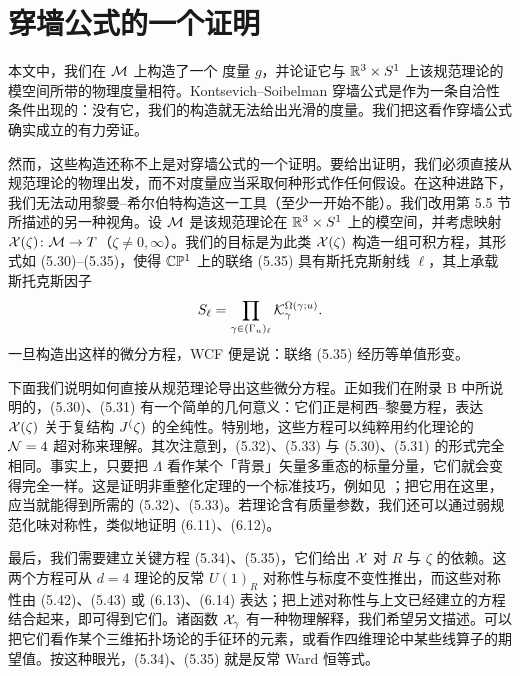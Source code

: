 \section{穿墙公式的一个证明}
\label{sec:proof}

本文中，我们在 $\mathcal{M}$ 上构造了一个 \hk 度量 $g$，并论证它与 $\mathbb{R}^3\times S^1$ 上该规范理论的模空间所带的物理度量相符。Kontsevich--Soibelman 穿墙公式是作为一条自洽性条件出现的：没有它，我们的构造就无法给出光滑的度量。我们把这看作穿墙公式确实成立的有力旁证。

然而，这些构造还称不上是对穿墙公式的一个证明。要给出证明，我们必须直接从规范理论的物理出发，而不对度量应当采取何种形式作任何假设。在这种进路下，我们无法动用黎曼--希尔伯特构造这一工具（至少一开始不能）。我们改用第 5.5 节所描述的另一种视角。设 $\mathcal{M}$ 是该规范理论在 $\mathbb{R}^3\times S^1$ 上的模空间，并考虑映射 $\mathcal{X}(\zeta)\colon \mathcal{M}\to T$（$\zeta\neq0,\infty$）。我们的目标是为此类 $\mathcal{X}(\zeta)$ 构造一组可积方程，其形式如 (5.30)–(5.35)，使得 $\mathbb{C}\mathbb{P}^1$ 上的联络 (5.35) 具有斯托克斯射线 $\ell$，其上承载斯托克斯因子
\begin{equation} \label{eq:sf-redux}
S_\ell = \prod_{\gamma \in (\Gamma_u)_\ell} \mathcal{K}_\gamma^{\Omega(\gamma;u)}.
\end{equation}
一旦构造出这样的微分方程，WCF 便是说：联络 (5.35) 经历等单值形变。%

下面我们说明如何直接从规范理论导出这些微分方程。正如我们在附录 B 中所说明的，(5.30)、(5.31) 有一个简单的几何意义：它们正是柯西--黎曼方程，表达 $\mathcal{X}(\zeta)$ 关于复结构 $J^(\zeta)$ 的全纯性。特别地，这些方程可以纯粹用约化理论的 $\mathcal{N}=4$ 超对称来理解。其次注意到，(5.32)、(5.33) 与 (5.30)、(5.31) 的形式完全相同。事实上，只要把 $\Lambda$ 看作某个「背景」矢量多重态的标量分量，它们就会变得完全一样。这是证明非重整化定理的一个标准技巧，例如见 \cite{Seiberg:1993vc}；把它用在这里，应当就能得到所需的 (5.32)、(5.33)。若理论含有质量参数，我们还可以通过弱规范化味对称性，类似地证明 (6.11)、(6.12)。%

最后，我们需要建立关键方程 (5.34)、(5.35)，它们给出 $\mathcal{X}$ 对 $R$ 与 $\zeta$ 的依赖。这两个方程可从 $d=4$ 理论的反常 $U(1)_R$ 对称性与标度不变性推出，而这些对称性由 (5.42)、(5.43) 或 (6.13)、(6.14) 表达；把上述对称性与上文已经建立的方程结合起来，即可得到它们。诸函数 $\mathcal{X}_\gamma$ 有一种物理解释，我们希望另文描述。可以把它们看作某个三维拓扑场论的手征环的元素，或看作四维理论中某些线算子的期望值。按这种眼光，(5.34)、(5.35) 就是反常 Ward 恒等式。%

